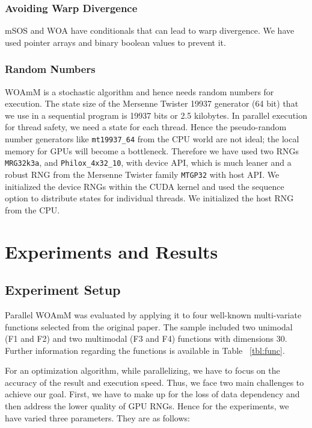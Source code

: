 \documentclass[conference]{IEEEtran}
\begin{document}
\subsubsection{Avoiding Warp Divergence}

mSOS and WOA have conditionals that can lead to warp divergence. 
We have used pointer arrays and binary boolean values to prevent it.

\subsubsection{Random Numbers}

WOAmM is a stochastic algorithm and hence needs random numbers for execution. 
The state size of the Mersenne Twister 19937 generator (64 bit) that we use in a sequential program is 19937 bits or 2.5 kilobytes. 
In parallel execution for thread safety, we need a state for each thread. 
Hence the pseudo-random number generators like \lstinline{mt19937_64} from the CPU world are not ideal; the local memory for GPUs will become a bottleneck. 
Therefore we have used two RNGs \lstinline{MRG32k3a}, and \lstinline{Philox_4x32_10}, with device API, which is much leaner and a  robust RNG from the Mersenne Twister family \lstinline{MTGP32} with host API.
We initialized the device RNGs within the CUDA kernel and used the sequence option to distribute states for individual threads.  
We initialized the host RNG from the CPU.

\section{Experiments and Results}

\subsection{Experiment Setup}

Parallel WOAmM was evaluated by applying it to four well-known multi-variate functions selected from the original paper. 
The sample included two unimodal (F1 and F2) and two multimodal (F3 and F4) functions with dimensions 30. 
Further information regarding the functions is available in Table ~\ref{tbl:func}.

For an optimization algorithm, while parallelizing, we have to focus on the accuracy of the result and execution speed. 
Thus, we face two main challenges to achieve our goal. 
First, we have to make up for the loss of data dependency and then address the lower quality of GPU RNGs. 
Hence for the experiments, we have varied three parameters. 
They are as follows:
\end{document}
